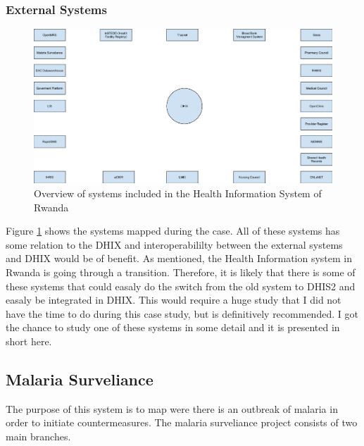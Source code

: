 \subsubsection{External Systems}
\begin{figure}
\centering
\includegraphics[width=12cm]{empirical/images/context}
\caption{Overview of systems included in the Health Information System of Rwanda}
\label{fig:context_systems}
\end{figure}
Figure \ref{fig:context_systems} shows the systems mapped during the case.
All of these systems has some relation to the DHIX and interoperabililty between the external systems and DHIX would be of benefit.
As mentioned, the Health Information system in Rwanda is going through a transition. 
Therefore, it is likely that there is some of these systems that could easaly do the switch from the old system to DHIS2 and easaly be integrated in DHIX.
This would require a huge study that I did not have the time to do during this case study, but is definitively recommended.  
I got the chance to study one of these systems in some detail and it is presented in short here. 
\subsection{Malaria Surveliance}
The purpose of this system is to map were there is an outbreak of malaria in order to initiate countermeasures.
The malaria surveliance project consists of two main branches. 
